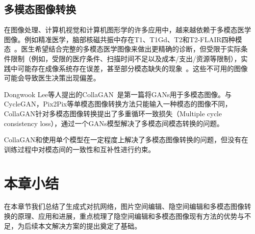 \subsection{多模态图像转换}

在图像处理、计算机视觉和计算机图形学的许多应用中，越来越依赖于多模态医学图像。例如精准医学，脑部核磁共振中存在T1、T1Gd、T2和T2-FLAIR四种模态~\cite{drevelegas2011imaging}。医生希望结合完整的多模态医学图像来做出更精确的诊断，但受限于实际条件限制（例如，受限的医疗条件、扫描时间不足以及成本/支出/资源等限制），实践中可能存在成像系统存在误差，甚至部分模态缺失的现象~\cite{tanenbaum2017synthetic}。这些不可用的图像可能会导致医生决策出现偏差。

Dongwook Lee等人提出的CollaGAN~\cite{collagan}是第一篇将GANs用于多模态图像。与CycleGAN，Pix2Pix等单模态图像转换方法只能输入一种模态的图像不同，CollaGAN针对多模态图像转换提出了多重循环一致损失（Multiple cycle consistency loss），通过一个GANs模型解决了多模态间模态转换的问题。

CollaGAN和使用单个模型在一定程度上解决了多模态图像转换的问题，但没有在训练过程中对模态间的一致性和互补性进行约束。

\section{本章小结}

在本章节我们总结了生成式对抗网络，图片空间编辑、隐空间编辑和多模态图像转换的原理、应用和进展，重点梳理了隐空间编辑和多模态图像现有方法的优势与不足，为后续本文解决方案的提出奠定了基础。
